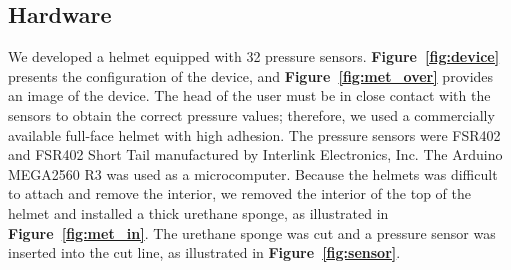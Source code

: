 \documentclass[sigchi,authordraft]{acmart}
\newcommand\figref[1]{\textbf{Figure~\ref{fig:#1}}}
\begin{document}



\subsection{Hardware}
We developed a helmet equipped with 32 pressure sensors. \figref{device} presents the configuration of the device, and \figref{met_over} provides an image of the device. The head of the user must be in close contact with the sensors to obtain the correct pressure values; therefore, we used a commercially available full-face helmet with high adhesion. The pressure sensors were FSR402 and FSR402 Short Tail manufactured by Interlink Electronics, Inc. The Arduino MEGA2560 R3 was used as a microcomputer. Because the helmets was difficult to attach and remove the interior, we removed the interior of the top of the helmet and installed a thick urethane sponge, as illustrated in \figref{met_in}. The urethane sponge was cut and a pressure sensor was inserted into the cut line, as illustrated in \figref{sensor}.\par
\end{document}
